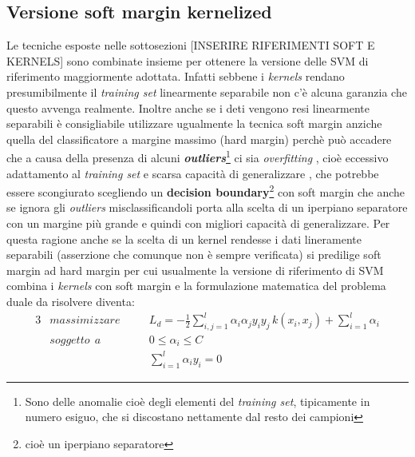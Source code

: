 \subsection{Versione soft margin kernelized}
Le tecniche esposte nelle sottosezioni [INSERIRE RIFERIMENTI SOFT E KERNELS] sono combinate insieme per ottenere la versione delle \ac{SVM} di riferimento maggiormente adottata. Infatti sebbene i  \textit{kernels} rendano presumibilmente il \textit{training set} linearmente separabile non c'è alcuna garanzia che questo avvenga realmente. Inoltre anche se i deti vengono resi linearmente separabili è consigliabile utilizzare ugualmente la tecnica soft margin anziche quella del classificatore a margine massimo (hard margin) perchè può accadere che a causa della presenza di alcuni \textbf{\textit{outliers}}\footnote{Sono delle anomalie cioè degli elementi del \textit{training set}, tipicamente in numero esiguo, che si discostano nettamente dal resto dei campioni} ci sia \textit{overfitting} , cioè eccessivo adattamento al \textit{training set} e scarsa capacità di generalizzare , che potrebbe essere scongiurato scegliendo un \textbf{decision boundary}\footnote{cioè un iperpiano separatore} con soft margin che anche se ignora gli \textit{outliers} misclassificandoli porta alla scelta di un iperpiano separatore con un margine più grande e quindi con migliori capacità di generalizzare. Per questa ragione anche se la scelta di un kernel rendesse i dati lineramente separabili (asserzione che comunque non è sempre verificata) si predilige soft margin ad hard margin per cui usualmente la versione di riferimento di \ac{SVM} combina i \textit{kernels} con soft margin e la formulazione matematica del problema duale da risolvere diventa:
\begin{alignat}{3}
\label{eq:softford}
&massimizzare \quad&&L_{d} = - \frac{1}{2} \sum_{i,j = 1}^{l}\alpha_{i}\alpha_{j}y_{i}y_{j}\,k(x_{i} , x_{j}) + \sum_{i=1}^{l}\alpha_{i} \\
\label{eq:softvincd}
&soggetto \:\:a &&0 \leq \alpha_i \leq C \qquad \qquad \\
\label{eq:softvind2}
&\:&&\sum_{i=1}^{l} \alpha_i y_i = 0 
\end{alignat}

